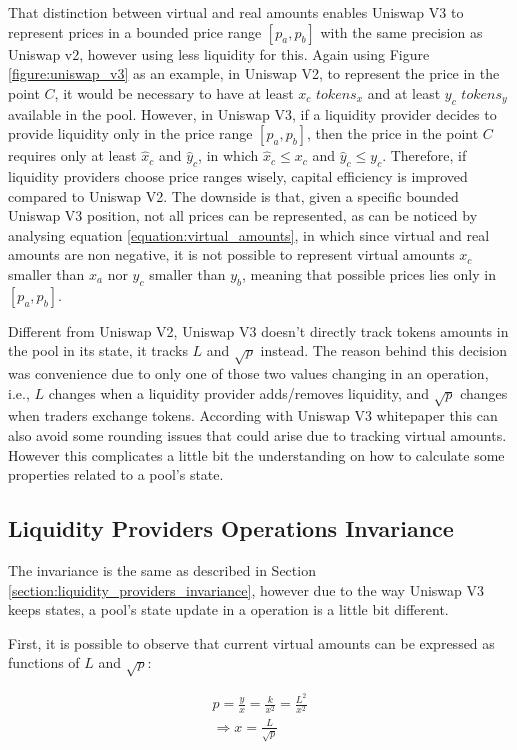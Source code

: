 \documentclass{article}
\begin{document}
That distinction between virtual and real amounts enables Uniswap V3 to represent prices in a bounded price range $[p_a, p_b]$ with the same precision as Uniswap v2, however using less liquidity for this.
Again using Figure \ref{figure:uniswap_v3} as an example, in Uniswap V2, to represent the price in the point $C$, it would be necessary to have at least $x_c$ $tokens_x$ and at least $y_c$ $tokens_y$ available in the pool.
However, in Uniswap V3, if a liquidity provider decides to provide liquidity only in the price range $[p_a, p_b]$, then the price in the point $C$ requires only at least $\hat{x}_c$ and $\hat{y}_c$, in which $\hat{x}_c \leq x_c$ and $\hat{y}_c \leq y_c$.
Therefore, if liquidity providers choose price ranges wisely, capital efficiency is improved compared to Uniswap V2.
The downside is that, given a specific bounded Uniswap V3 position, not all prices can be represented, as can be noticed by analysing equation \ref{equation:virtual_amounts}, in which since virtual and real amounts are non negative, it is not possible to represent virtual amounts $x_c$ smaller than $x_a$ nor $y_c$ smaller than $y_b$, meaning that possible prices lies only in $[p_a, p_b]$.

Different from Uniswap V2, Uniswap V3 doesn't directly track tokens amounts in the pool in its state, it tracks $L$ and $\sqrt{p}$ instead.
The reason behind this decision was convenience due to only one of those two values changing in an operation, i.e., $L$ changes when a liquidity provider adds/removes liquidity, and $\sqrt{p}$ changes when traders exchange tokens.
According with Uniswap V3 whitepaper this can also avoid some rounding issues that could arise due to tracking virtual amounts.
However this complicates a little bit the understanding on how to calculate some properties related to a pool's state.

\subsection{Liquidity Providers Operations Invariance}

The invariance is the same as described in Section \ref{section:liquidity_providers_invariance}, however due to the way Uniswap V3 keeps states, a pool's state update in a operation is a little bit different.

First, it is possible to observe that current virtual amounts can be expressed as functions of $L$ and $\sqrt{p}$:

\begin{equation}
    \label{equation:x}
    \begin{split}
        p=\frac{y}{x}=\frac{k}{x^2}=\frac{L^2}{x^2} \\
        \Rightarrow x=\frac{L}{\sqrt{p}}
    \end{split}
\end{equation}
\end{document}
